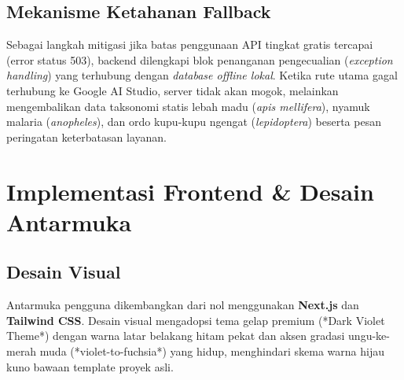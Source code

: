 \documentclass[12pt, a4paper]{article}
\begin{document}
\subsection{Mekanisme Ketahanan Fallback}
Sebagai langkah mitigasi jika batas penggunaan API tingkat gratis tercapai (error status 503), backend dilengkapi blok penanganan pengecualian (\textit{exception handling}) yang terhubung dengan \textit{database offline lokal}. Ketika rute utama gagal terhubung ke Google AI Studio, server tidak akan mogok, melainkan mengembalikan data taksonomi statis lebah madu (\textit{apis mellifera}), nyamuk malaria (\textit{anopheles}), dan ordo kupu-kupu ngengat (\textit{lepidoptera}) beserta pesan peringatan keterbatasan layanan.

\newpage
\section{Implementasi Frontend \& Desain Antarmuka}

\subsection{Desain Visual}
Antarmuka pengguna dikembangkan dari nol menggunakan \textbf{Next.js} dan \textbf{Tailwind CSS}. Desain visual mengadopsi tema gelap premium (*Dark Violet Theme*) dengan warna latar belakang hitam pekat dan aksen gradasi ungu-ke-merah muda (*violet-to-fuchsia*) yang hidup, menghindari skema warna hijau kuno bawaan template proyek asli.
\end{document}

